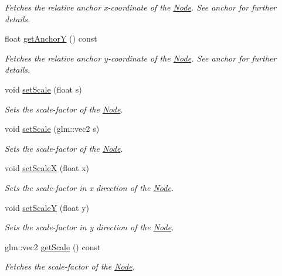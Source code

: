 \begin{DoxyCompactItemize}
\begin{DoxyCompactList}\small\item\em Fetches the relative anchor x-\/coordinate of the \mbox{\hyperlink{classsage_1_1Node}{Node}}. See anchor for further details. \end{DoxyCompactList}\item 
float \mbox{\hyperlink{classsage_1_1Node_a78c5f86d0081854603178fb52d8c0a9b}{get\+AnchorY}} () const
\begin{DoxyCompactList}\small\item\em Fetches the relative anchor y-\/coordinate of the \mbox{\hyperlink{classsage_1_1Node}{Node}}. See anchor for further details. \end{DoxyCompactList}\item 
void \mbox{\hyperlink{classsage_1_1Node_a939698b2eb68ee5b60b91e2426e95369}{set\+Scale}} (float s)
\begin{DoxyCompactList}\small\item\em Sets the scale-\/factor of the \mbox{\hyperlink{classsage_1_1Node}{Node}}. \end{DoxyCompactList}\item 
void \mbox{\hyperlink{classsage_1_1Node_aecff30b003ce1c2266cc60a34b72559d}{set\+Scale}} (glm\+::vec2 s)
\begin{DoxyCompactList}\small\item\em Sets the scale-\/factor of the \mbox{\hyperlink{classsage_1_1Node}{Node}}. \end{DoxyCompactList}\item 
void \mbox{\hyperlink{classsage_1_1Node_ab8126397f90ccdee0755b984b26809d8}{set\+ScaleX}} (float x)
\begin{DoxyCompactList}\small\item\em Sets the scale-\/factor in x direction of the \mbox{\hyperlink{classsage_1_1Node}{Node}}. \end{DoxyCompactList}\item 
void \mbox{\hyperlink{classsage_1_1Node_afa22161545d63e9e011f8eeb5acdead7}{set\+ScaleY}} (float y)
\begin{DoxyCompactList}\small\item\em Sets the scale-\/factor in y direction of the \mbox{\hyperlink{classsage_1_1Node}{Node}}. \end{DoxyCompactList}\item 
glm\+::vec2 \mbox{\hyperlink{classsage_1_1Node_af1a9bc0715acbc80623b5a15a5f65f3f}{get\+Scale}} () const
\begin{DoxyCompactList}\small\item\em Fetches the scale-\/factor of the \mbox{\hyperlink{classsage_1_1Node}{Node}}. \end{DoxyCompactList}\item 

\end{DoxyCompactItemize}
